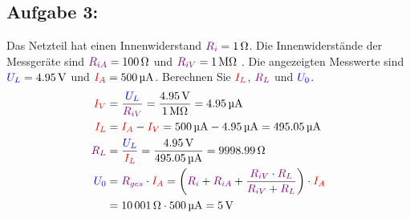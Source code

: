 \documentclass[a4paper,titlepage,parskip]{scrreprt}
\newcommand{\spannung}[1]{\textcolor{blue}{#1}}
\newcommand{\strom}[1]{\textcolor{red}{#1}}
\newcommand{\widerstand}[1]{\textcolor{violet}{#1}}
\begin{document}
           \subsection{Aufgabe 3:}  Das Netzteil hat einen Innenwiderstand $\widerstand{R_i} = \SI{1}{\ohm}$. Die Innenwiderstände der Messgeräte sind $\widerstand{R_{iA}} = \SI{100}{\ohm}$ und $\widerstand{R_{iV}} = \SI{1}{\mega\ohm}$ . Die angezeigten Messwerte sind $\spannung{U_L} = \SI{4,95}{\volt}$ und $\strom{I_A} = \SI{500}{\micro\ampere}$.  Berechnen Sie $\strom{I_L}$, $\widerstand{R_L}$ und $\spannung{U_0}$.
           \begin{align*}
               \strom{I_V} &= \frac{\spannung{U_L}}{\widerstand{R_{iV}}} = \frac{\SI{4,95}{\volt}}{\SI{1}{\mega\ohm}} = \SI{4,95}{\micro\ampere}\\
               \strom{I_L} &= \strom{I_A} - \strom{I_V} = \SI{500}{\micro\ampere} - \SI{4,95}{\micro\ampere} = \SI{495,05}{\micro\ampere}\\
               \widerstand{R_L} &= \frac{\spannung{U_L}}{\strom{I_L}} = \frac{\SI{4,95}{\volt}}{\SI{495,05}{\micro\ampere}} = \SI{9998,99}{\ohm}\\
               \spannung{U_0} &= \widerstand{R_{ges}} \cdot \strom{I_A} = \left(\widerstand{R_i} + \widerstand{R_{iA}} + \frac{\widerstand{R_{iV}} \cdot \widerstand{R_L}}{\widerstand{R_{iV}} + \widerstand{R_L}}\right) \cdot \strom{I_A}\\
               &= \SI{10001}{\ohm} \cdot \SI{500}{\micro\ampere} = \SI{5}{\volt}
           \end{align*}
\end{document}
